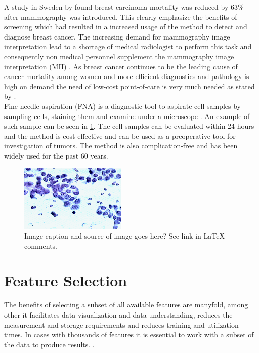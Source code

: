 \documentclass{kththesis}
\begin{document}
A study in Sweden by \textcite{tabar2001} found breast carcinoma mortality was reduced by 63\% after mammography was introduced. This clearly emphasize the benefits of screening which had resulted in a increased usage of the method to detect and diagnose breast cancer. The increasing demand for mammography image interpretation lead to a shortage of medical radiologist to perform this task and consequently non medical personnel supplement the mammography image interpretation (MII) \parencite{culpan2016}. As breast cancer continues to be the leading cause of cancer mortality among women and more efficient diagnostics and pathology is high on demand the need of low-cost point-of-care is very much needed as stated by \textcite{martei2018}.\\

Fine needle aspiration (FNA) is a diagnostic tool to aspirate cell samples by sampling cells, staining them and examine under a microscope \parencite{FNA}. An example of such sample can be seen in \ref{fig:fna_nuclei}. The cell samples can be evaluated within 24 hours and the method is cost-effective and can be used as a preoperative tool for investigation of tumors. The method is also complication-free and has been widely used for the past 60 years.

\begin{figure}[ht!]
  \centering
  \includegraphics[]{images/fna_nuclei.png}
  \caption{Image caption and source of image goes here? See link in LaTeX comments.}
  \label{fig:fna_nuclei}
\end{figure}


\section{Feature Selection}

The benefits of selecting a subset of all available features are manyfold, among other it facilitates data visualization and data understanding, reduces the measurement and storage requirements and reduces training and utilization times. In cases with thousands of features it is essential to work with a subset of the data to produce results. \parencite{guyon2003}.
\end{document}

